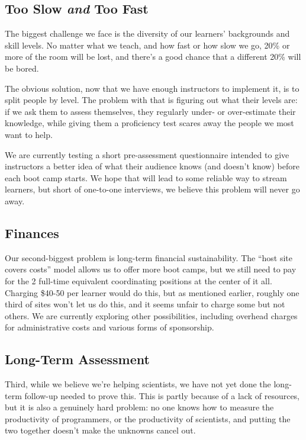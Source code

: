 \documentclass{article}
\begin{document}
\subsection{Too Slow \emph{and} Too Fast}

The biggest challenge we face is the diversity of our learners'
backgrounds and skill levels. No matter what we teach, and how fast or
how slow we go, 20\% or more of the room will be lost, and there's a
good chance that a different 20\% will be bored.

The obvious solution, now that we have enough instructors to implement
it, is to split people by level. The problem with that is figuring out
what their levels are: if we ask them to assess themselves, they
regularly under- or over-estimate their knowledge, while giving them a
proficiency test scares away the people we most want to help.

We are currently testing a short pre-assessment questionnaire intended
to give instructors a better idea of what their audience knows (and
doesn't know) before each boot camp starts. We hope that will lead to
some reliable way to stream learners, but short of one-to-one
interviews, we believe this problem will never go away.

\subsection{Finances}

Our second-biggest problem is long-term financial sustainability. The
``host site covers costs'' model allows us to offer more boot camps, but
we still need to pay for the 2 full-time equivalent coordinating
positions at the center of it all. Charging \$40-50 per learner would do
this, but as mentioned earlier, roughly one third of sites won't let us
do this, and it seems unfair to charge some but not others. We are
currently exploring other possibilities, including overhead charges for
administrative costs and various forms of sponsorship.

\subsection{Long-Term Assessment}

Third, while we believe we're helping scientists, we have not yet done
the long-term follow-up needed to prove this. This is partly because of
a lack of resources, but it is also a genuinely hard problem: no one
knows how to measure the productivity of programmers, or the
productivity of scientists, and putting the two together doesn't make
the unknowns cancel out.
\end{document}

